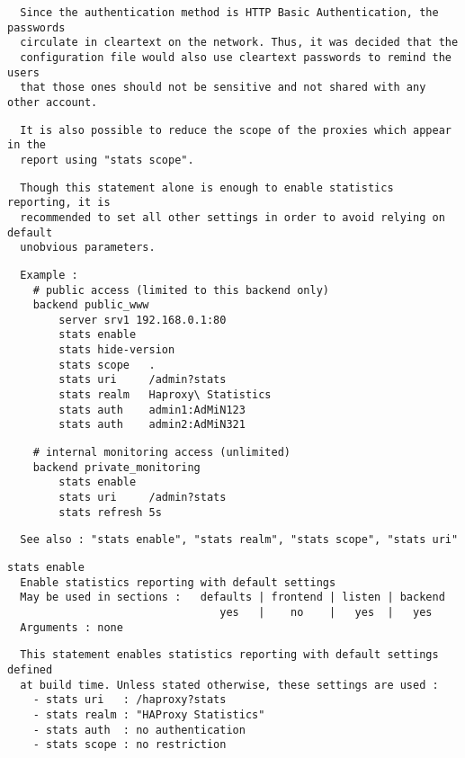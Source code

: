 \begin{verbatim}
  Since the authentication method is HTTP Basic Authentication, the passwords
  circulate in cleartext on the network. Thus, it was decided that the
  configuration file would also use cleartext passwords to remind the users
  that those ones should not be sensitive and not shared with any other account.
\end{verbatim}

\begin{verbatim}
  It is also possible to reduce the scope of the proxies which appear in the
  report using "stats scope".
\end{verbatim}

\begin{verbatim}
  Though this statement alone is enough to enable statistics reporting, it is
  recommended to set all other settings in order to avoid relying on default
  unobvious parameters.
\end{verbatim}

\begin{verbatim}
  Example :
    # public access (limited to this backend only)
    backend public_www
        server srv1 192.168.0.1:80
        stats enable
        stats hide-version
        stats scope   .
        stats uri     /admin?stats
        stats realm   Haproxy\ Statistics
        stats auth    admin1:AdMiN123
        stats auth    admin2:AdMiN321
\end{verbatim}

\begin{verbatim}
    # internal monitoring access (unlimited)
    backend private_monitoring
        stats enable
        stats uri     /admin?stats
        stats refresh 5s
\end{verbatim}

\begin{verbatim}
  See also : "stats enable", "stats realm", "stats scope", "stats uri"
\end{verbatim}

\begin{verbatim}
stats enable
  Enable statistics reporting with default settings
  May be used in sections :   defaults | frontend | listen | backend
                                 yes   |    no    |   yes  |   yes
  Arguments : none
\end{verbatim}

\begin{verbatim}
  This statement enables statistics reporting with default settings defined
  at build time. Unless stated otherwise, these settings are used :
    - stats uri   : /haproxy?stats
    - stats realm : "HAProxy Statistics"
    - stats auth  : no authentication
    - stats scope : no restriction
\end{verbatim}

